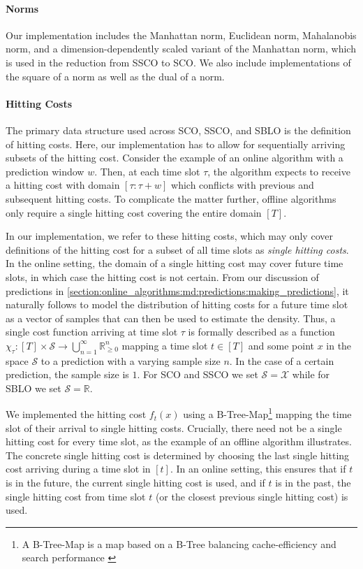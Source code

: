 \paragraph{Norms} Our implementation includes the Manhattan norm, Euclidean norm, Mahalanobis norm, and a dimension-dependently scaled variant of the Manhattan norm, which is used in the reduction from SSCO to SCO. We also include implementations of the square of a norm as well as the dual of a norm.

\paragraph{Hitting Costs} The primary data structure used across SCO, SSCO, and SBLO is the definition of hitting costs. Here, our implementation has to allow for sequentially arriving subsets of the hitting cost. Consider the example of an online algorithm with a prediction window $w$. Then, at each time slot $\tau$, the algorithm expects to receive a hitting cost with domain $[\tau : \tau + w]$ which conflicts with previous and subsequent hitting costs. To complicate the matter further, offline algorithms only require a single hitting cost covering the entire domain $[T]$.

In our implementation, we refer to these hitting costs, which may only cover definitions of the hitting cost for a subset of all time slots as \emph{single hitting costs}. In the online setting, the domain of a single hitting cost may cover future time slots, in which case the hitting cost is not certain. From our discussion of predictions in \autoref{section:online_algorithms:md:predictions:making_predictions}, it naturally follows to model the distribution of hitting costs for a future time slot as a vector of samples that can then be used to estimate the density. Thus, a single cost function arriving at time slot $\tau$ is formally described as a function $\chi_{\tau} : [T] \times \mathcal{S} \to \bigcup_{n=1}^{\infty} \mathbb{R}_{\geq 0}^n$ mapping a time slot $t \in [T]$ and some point $x$ in the space $\mathcal{S}$ to a prediction with a varying sample size $n$. In the case of a certain prediction, the sample size is $1$. For SCO and SSCO we set $\mathcal{S} = \mathcal{X}$ while for SBLO we set $\mathcal{S} = \mathbb{R}$.

We implemented the hitting cost $f_t(x)$ using a B-Tree-Map\footnote{A B-Tree-Map is a map based on a B-Tree balancing cache-efficiency and search performance \cite{BTreeMap}} mapping the time slot of their arrival to single hitting costs. Crucially, there need not be a single hitting cost for every time slot, as the example of an offline algorithm illustrates. The concrete single hitting cost is determined by choosing the last single hitting cost arriving during a time slot in $[t]$. In an online setting, this ensures that if $t$ is in the future, the current single hitting cost is used, and if $t$ is in the past, the single hitting cost from time slot $t$ (or the closest previous single hitting cost) is used.

